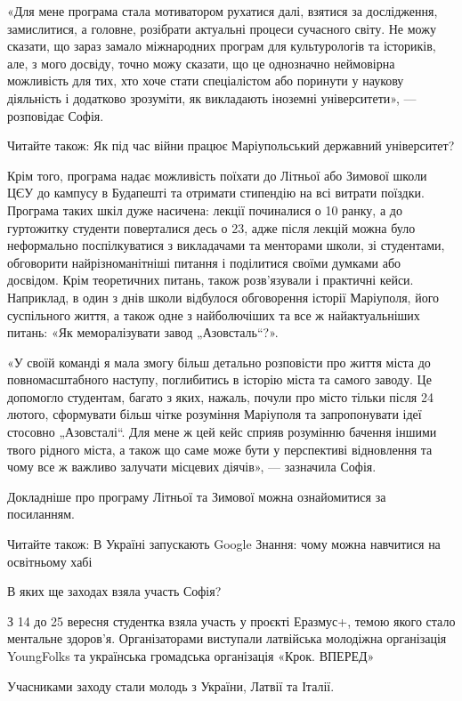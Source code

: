 «Для мене програма стала мотиватором рухатися далі, взятися за дослідження,
замислитися, а головне, розібрати актуальні процеси сучасного світу. Не можу
сказати, що зараз замало міжнародних програм для культурологів та істориків,
але, з мого досвіду, точно можу сказати, що це однозначно неймовірна можливість
для тих, хто хоче стати спеціалістом або поринути у наукову діяльність і
додатково зрозуміти, як викладають іноземні університети», — розповідає Софія.

Читайте також: Як під час війни працює Маріупольський державний університет?

Крім того, програма надає можливість поїхати до Літньої або Зимової школи ЦЄУ
до кампусу в Будапешті та отримати стипендію на всі витрати поїздки. Програма
таких шкіл дуже насичена: лекції починалися о 10 ранку, а до гуртожитку
студенти поверталися десь о 23, адже після лекцій можна було неформально
поспілкуватися з викладачами та менторами школи, зі студентами, обговорити
найрізноманітніші питання і поділитися своїми думками або досвідом. Крім
теоретичних питань, також розв'язували і практичні кейси. Наприклад, в один з
днів школи відбулося обговорення історії Маріуполя, його суспільного життя, а
також одне з найболючіших та все ж найактуальніших питань: «Як меморалізувати
завод „Азовсталь“?».

«У своїй команді я мала змогу більш детально розповісти про життя міста до
повномасштабного наступу, поглибитись в історію міста та самого заводу. Це
допомогло студентам, багато з яких, нажаль, почули про місто тільки після 24
лютого, сформувати більш чітке розуміння Маріуполя та запропонувати ідеї
стосовно „Азовсталі“. Для мене ж цей кейс сприяв розумінню бачення іншими твого
рідного міста, а також що саме може бути у перспективі відновлення та чому все
ж важливо залучати місцевих діячів», — зазначила Софія.

Докладніше про програму Літньої та Зимової можна ознайомитися за посиланням.

Читайте також: В Україні запускають Google Знання: чому можна навчитися на
освітньому хабі

В яких ще заходах взяла участь Софія?

З 14 до 25 вересня студентка взяла участь у проєкті Еразмус+, темою якого стало
ментальне здоров'я. Організаторами виступали латвійська молодіжна організація
YoungFolks та українська громадська організація «Крок. ВПЕРЕД»

Учасниками заходу стали молодь з України, Латвії та Італії.

